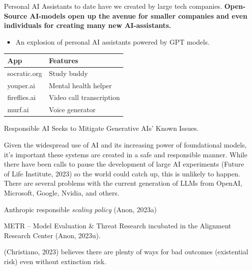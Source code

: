 \documentclass[
  letterpaper,
  DIV=11,
  numbers=noendperiod]{scrartcl}
\providecommand{\tightlist}{%
  \setlength{\itemsep}{0pt}\setlength{\parskip}{0pt}}\usepackage{longtable,booktabs,array}
\begin{document}
Personal AI Assistants to date have we created by large tech companies.
\textbf{Open-Source AI-models open up the avenue for smaller companies
and even individuals for creating many new AI-assistants.}

\begin{itemize}
\tightlist
\item
  An explosion of personal AI assistants powered by GPT models.
\end{itemize}

\begin{longtable}[]{@{}ll@{}}
\toprule\noalign{}
App & Features \\
\midrule\noalign{}
\endhead
\bottomrule\noalign{}
\endlastfoot
socratic.org & Study buddy \\
youper.ai & Mental health helper \\
fireflies.ai & Video call transcription \\
murf.ai & Voice generator \\
\end{longtable}

Responsible AI Seeks to Mitigate Generative AIs' Known Issues.

Given the widespread use of AI and its increasing power of foundational
models, it's important these systems are created in a safe and
responsible manner. While there have been calls to pause the development
of large AI experiments (Future of Life Institute, 2023) so the world
could catch up, this is unlikely to happen. There are several problems
with the current generation of LLMs from OpenAI, Microsoft, Google,
Nvidia, and others.

Anthropic responsible \emph{scaling policy} (Anon, 2023a)

METR -- Model Evaluation \& Threat Research incubated in the Alignment
Research Center (Anon, 2023u).

(Christiano, 2023) believes there are plenty of ways for bad outcomes
(existential risk) even without extinction risk.
\end{document}
